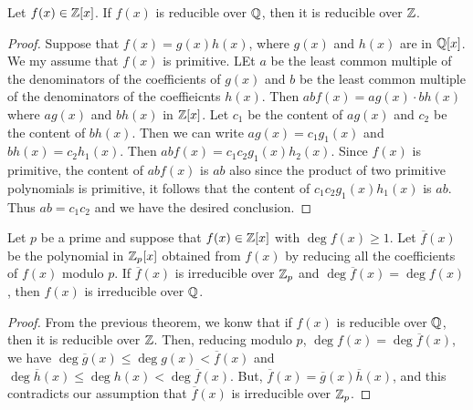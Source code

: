 \begin{theorem}
	Let $f(x)\in\mathbb{Z}[x]$. If $f(x)$ is reducible over $\mathbb{Q}$, then it is reducible over $\mathbb{Z}$.
\end{theorem}
\begin{proof}
	Suppose that $f(x)=g(x)h(x)$, where $g(x)$ and $h(x)$ are in $\mathbb{Q}[x]$. We my assume that $f(x)$ is primitive. LEt $a$ be the least common multiple of the denominators of the coefficients of $g(x)$ and $b$ be the least common multiple of the denominators of the coeffieicnts $h(x)$. Then $abf(x)=ag(x)\cdot bh(x)$ where $ag(x)$ and $bh(x)$ in $\mathbb{Z}[x]$. Let $c_1$ be the content of $ag(x)$ and $c_2$ be the content of $bh(x)$. Then we can write $ag(x)=c_1g_1(x)$ and $bh(x)=c_2h_1(x)$. Then $abf(x)=c_1c_2g_1(x)h_2(x)$. Since $f(x)$ is primitive, the content of $abf(x)$ is $ab$ also since the product of two primitive polynomials is primitive, it follows that the content of $c_1c_2g_1(x)h_1(x)$ is $ab$. Thus $ab=c_1c_2$ and we have the desired conclusion.
\end{proof}

\begin{proposition}
	Let $p$ be a prime and suppose that $f(x)\in\mathbb{Z}[x]$ with $\deg f(x)\ge1$. Let $\overline{f}(x)$ be the polynomial in $\mathbb{Z}_p[x]$ obtained from $f(x)$ by reducing all the coefficients of $f(x)$ modulo $p$. If $\overline{f}(x)$ is irreducible over $\mathbb{Z}_p$ and $\deg\overline{f}(x)=\deg f(x)$, then $f(x)$ is irreducible over $\mathbb{Q}$.
\end{proposition}
\begin{proof}
	From the previous theorem, we konw that if $f(x)$ is reducible over $\mathbb{Q}$, then it is reducible over $\mathbb{Z}$. Then, reducing modulo $p$, $\deg f(x) = \deg \overline{f}(x)$, we have $\deg\overline{g}(x)\le\deg g(x) < \overline{f}(x)$ and $\deg\overline{h}(x)\le\deg h(x)<\deg\overline{f}(x)$. But, $\overline{f}(x)=\overline{g}(x)\overline{h}(x)$, and this contradicts our assumption that $\overline{f}(x)$ is irreducible over $\mathbb{Z}_p$.
\end{proof}

